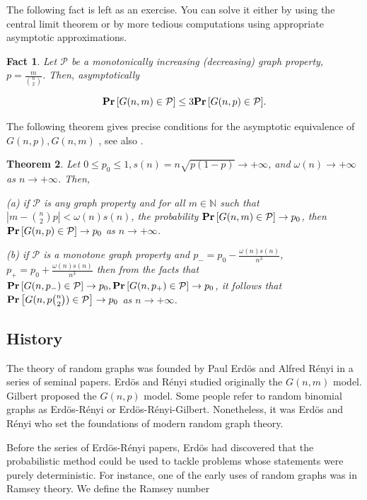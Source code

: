 \documentclass[twoside]{article}
\newcommand{\field}[1]{\mathbb{#1}} %
\newcounter{lecnum}
\newtheorem{theorem}{Theorem}[lecnum]
\newtheorem{fact}[theorem]{Fact}
\newcommand{\Prob}[1]{{{\bf{Pr}}\left[{#1}\right]}}
\begin{document}
 The following fact is left as an exercise. You can solve it either by using the central limit
theorem or by more tedious computations using appropriate asymptotic approximations. 
\begin{fact}
Let $\mathcal{P}$ be a monotonically increasing (decreasing) graph property, 
$p=\frac{m}{ {n \choose 2}}$. 
Then, asymptotically 

$$ \Prob{ G(n,m) \in \mathcal{P}} \leq 3  \Prob{G(n,p) \in \mathcal{P}}.$$

\end{fact}


The following theorem gives precise conditions 
for the asymptotic equivalence of $G(n,p), G(n,m)$ \cite{friezekaronski}, see also \cite{bollobas2001random}. 

\begin{theorem}
Let $0 \leq p_0 \leq 1, s(n) =n \sqrt{p(1-p)} \rightarrow +\infty$, and $\omega(n) \rightarrow +\infty$ 
as $n \rightarrow +\infty$.  Then, 

(a) if $\mathcal{P}$ is any graph property and for all $m \in \field{N}$ such that 
$|m- {n \choose 2}p| <\omega(n)s(n)$, the probability $\Prob{G(n,m) \in \mathcal{P} } \rightarrow p_0$,
then $\Prob{G(n,p) \in \mathcal{P} } \rightarrow p_0$ as $n \rightarrow +\infty$.

(b) if $\mathcal{P}$ is a monotone graph property and $p_{-} = p_0 - \frac{\omega{(n)}s(n)}{n^3}$, 
$p_+ = p_0 +\frac{\omega{(n)}s(n)}{n^3}$ then from the facts that 
$\Prob{ G(n,p_{-}) \in \mathcal{P} } \rightarrow p_0, \Prob{ G(n,p_{+}) \in \mathcal{P} } \rightarrow p_0$,
it follows that $\Prob{ G(n,p{n \choose 2}) \in \mathcal{P} } \rightarrow p_0$ as $n \rightarrow +\infty$.
\end{theorem} 


\subsection{History} 
\label{subsec:lec1unclepaul}

The theory of random graphs was founded  by Paul Erd\"os  and Alfred R\'enyi 
in a series of seminal papers. Erd\"os  and R\'enyi studied 
originally the $G(n,m)$ model. Gilbert proposed the $G(n,p)$ model. 
Some people refer to random binomial graphs as Erd\"os-R\'enyi 
or Erd\"os-R\'enyi-Gilbert. Nonetheless, it was Erd\"os and R\'enyi 
who set the foundations of modern random graph theory. 

Before the series of  Erd\"os-R\'enyi papers, Erd\"os  had discovered that 
the probabilistic method could be used to tackle problems whose statements
were purely deterministic. 
For instance, one of the early uses of random 
graphs was in Ramsey theory. We define the Ramsey number 
\end{document}

